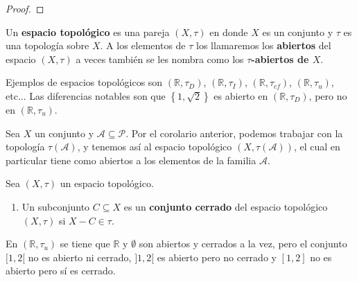 \documentclass[12pt]{report}
\theoremstyle{largebreak}
\begin{document}
    \begin{proof}
        
    \end{proof}

    \begin{mydef}
        Un \textbf{espacio topológico} es una pareja $(X,\tau)$ en donde $X$ es un conjunto y $\tau$ es una topología sobre $X$. A los elementos de $\tau$ los llamaremos los \textbf{abiertos} del espacio $(X,\tau)$ a veces también se les nombra como los \textbf{$\tau$-abiertos de $X$}.
    \end{mydef}

    \begin{exa}
        Ejemplos de espacios topológicos son $(\mathbb{R},\tau_D)$, $(\mathbb{R},\tau_I)$, $(\mathbb{R},\tau_{cf})$, $(\mathbb{R},\tau_u)$, etc... Las diferencias notables son que $\left\{1,\sqrt{2} \right\}$ es abierto en $(\mathbb{R},\tau_D)$, pero no en $(\mathbb{R},\tau_u)$.
    \end{exa}

    Sea $X$ un conjunto y $\mathcal{A}\subseteq\mathcal{P}$. Por el corolario anterior, podemos trabajar con la topología $\tau(\mathcal{A})$, y tenemos así al espacio topológico $(X,\tau(\mathcal{A}))$, el cual en particular tiene como abiertos a los elementos de la familia $\mathcal{A}$.
    
    \begin{mydef}
        Sea $(X,\tau)$ un espacio topológico.
        \begin{enumerate}
            \item Un subconjunto $C\subseteq X$ es un \textbf{conjunto cerrado} del espacio topológico $(X,\tau)$ si $X-C\in\tau$.
        \end{enumerate}
    \end{mydef}

    \begin{exa}
        En $(\mathbb{R},\tau_u)$ se tiene que $\mathbb{R}$ y $\emptyset$ son abiertos y cerrados a la vez, pero el conjunto $[1,2[$ no es abierto ni cerrado, $]1,2[$ es abierto pero no cerrado y $[1,2]$ no es abierto pero sí es cerrado.
    \end{exa}
    
\end{document}
